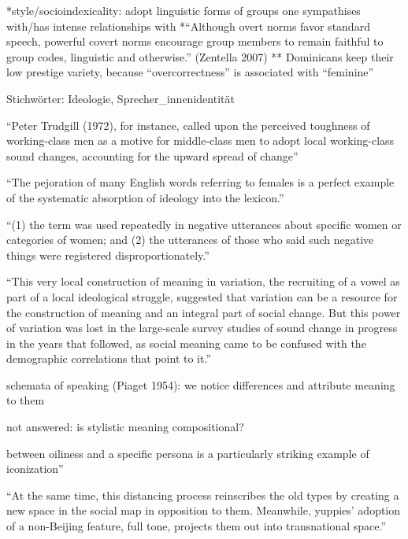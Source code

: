 
%
%

*style/socioindexicality: adopt linguistic forms of groups one sympathises with/has intense
relationships with
*``Although overt norms favor standard speech, powerful covert norms encourage
group members to remain faithful to group codes, linguistic and otherwise.'' (Zentella 2007)
** Dominicans keep their low prestige variety, because ``overcorrectness'' is associated with
``feminine''

Stichwörter:
Ideologie, Sprecher\_innenidentität

``Peter Trudgill
(1972), for instance, called upon the perceived toughness of working-class men
as a motive for middle-class men to adopt local working-class sound changes,
accounting for the upward spread of change''

``The
pejoration of many English words referring to females is a perfect example of the
systematic absorption of ideology into the lexicon.''

``(1) the term was used
repeatedly in negative utterances about specific women or categories of women;
and (2) the utterances of those who said such negative things were registered
disproportionately.''

``This very local construction of meaning in variation, the recruiting of
a vowel as part of a local ideological struggle, suggested that variation can be a
resource for the construction of meaning and an integral part of social change. But
this power of variation was lost in the large-scale survey studies of sound change
in progress in the years that followed, as social meaning came to be confused
with the demographic correlations that point to it.''

schemata of speaking (Piaget 1954): we notice differences and attribute meaning to them

not answered: is stylistic meaning compositional?

between oiliness and a specific persona is a particularly striking example
of iconization''

``At the same time,
this distancing process reinscribes the old types by creating a new space
in the social map in opposition to them. Meanwhile, yuppies’ adoption
of a non-Beijing feature, full tone, projects them out into transnational
space.''

